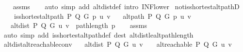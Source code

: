 \begin{isabellebody}
%
\isadelimproof
\ \ %
\endisadelimproof
%
\isatagproof
{}\isamarkupfalse%
\ assms\isanewline
\ \ \isamarkupfalse%
\ {\isacharparenleft}{\kern0pt}auto\ simp\ add{\isacharcolon}{\kern0pt}\ alt{\isacharunderscore}{\kern0pt}dist{\isacharunderscore}{\kern0pt}def\ intro{\isacharcolon}{\kern0pt}\ INF{\isacharunderscore}{\kern0pt}lower{\isacharparenright}{\kern0pt}%
\endisatagproof
{\isafoldproof}%
%
\isadelimproof
\isanewline
%
\endisadelimproof
%
\isadeliminvisible
\isanewline
%
\endisadeliminvisible
%
\isataginvisible
{}\isamarkupfalse%
\ not{\isacharunderscore}{\kern0pt}is{\isacharunderscore}{\kern0pt}shortest{\isacharunderscore}{\kern0pt}alt{\isacharunderscore}{\kern0pt}pathD{\isacharcolon}{\kern0pt}\isanewline
\ \ \ {\isachardoublequoteopen}{\isasymnot}\ is{\isacharunderscore}{\kern0pt}shortest{\isacharunderscore}{\kern0pt}alt{\isacharunderscore}{\kern0pt}path\ P\ Q\ G\ p\ u\ v{\isachardoublequoteclose}\isanewline
\ \ \ {\isachardoublequoteopen}alt{\isacharunderscore}{\kern0pt}path\ P\ Q\ G\ p\ u\ v{\isachardoublequoteclose}\isanewline
\ \ \ {\isachardoublequoteopen}alt{\isacharunderscore}{\kern0pt}dist\ P\ Q\ G\ u\ v\ {\isacharless}{\kern0pt}\ path{\isacharunderscore}{\kern0pt}length\ p{\isachardoublequoteclose}%
\endisataginvisible
{\isafoldinvisible}%
%
\isadeliminvisible
\isanewline
%
\endisadeliminvisible
%
\isadelimproof
\ \ %
\endisadelimproof
%
\isatagproof
{}\isamarkupfalse%
\ assms\isanewline
\ \ \isamarkupfalse%
\ {\isacharparenleft}{\kern0pt}auto\ simp\ add{\isacharcolon}{\kern0pt}\ is{\isacharunderscore}{\kern0pt}shortest{\isacharunderscore}{\kern0pt}alt{\isacharunderscore}{\kern0pt}path{\isacharunderscore}{\kern0pt}def\ dest{\isacharcolon}{\kern0pt}\ alt{\isacharunderscore}{\kern0pt}dist{\isacharunderscore}{\kern0pt}le{\isacharunderscore}{\kern0pt}alt{\isacharunderscore}{\kern0pt}path{\isacharunderscore}{\kern0pt}length{\isacharparenright}{\kern0pt}%
\endisatagproof
{\isafoldproof}%
%
\isadelimproof
\isanewline
%
\endisadelimproof
\isanewline
\isanewline
{}\isamarkupfalse%
\ alt{\isacharunderscore}{\kern0pt}dist{\isacharunderscore}{\kern0pt}alt{\isacharunderscore}{\kern0pt}reachable{\isacharunderscore}{\kern0pt}conv{\isacharcolon}{\kern0pt}\isanewline
\ \ \ {\isachardoublequoteopen}alt{\isacharunderscore}{\kern0pt}dist\ P\ Q\ G\ u\ v\ {\isasymnoteq}\ {\isasyminfinity}\ {\isacharequal}{\kern0pt}\ alt{\isacharunderscore}{\kern0pt}reachable\ P\ Q\ G\ u\ v{\isachardoublequoteclose}\isanewline

\end{isabellebody}
